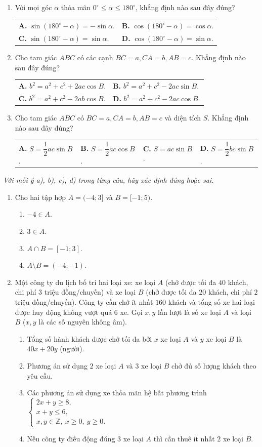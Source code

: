 \documentclass[12pt,a4paper]{article}
\makeatletter
\newcommand{\parttitle}[1]{\par\vspace{3pt}{\large\bfseries\color{ink}#1}\par\vspace{2pt}}
\newcommand{\four}[4]{\par\noindent\begin{tabularx}{\linewidth}{@{}*{4}{>{\raggedright\arraybackslash}X}@{}}\textbf{A.} #1&\textbf{B.} #2&\textbf{C.} #3&\textbf{D.} #4\end{tabularx}}
\newcommand{\two}[4]{\par\noindent\begin{tabularx}{\linewidth}{@{}*{2}{>{\raggedright\arraybackslash}X}@{}}\textbf{A.} #1&\textbf{B.} #2\\[3pt]\textbf{C.} #3&\textbf{D.} #4\end{tabularx}}
\makeatother
\begin{document}
\begin{enumerate}
\four{$\sin\alpha < 0$.}{$\cos\alpha < 0$.}{$\tan\alpha > 0$.}{$\cot\alpha > 0$.}
\item Với mọi góc $\alpha$ thỏa mãn $0^\circ \leq \alpha \leq 180^\circ$, khẳng định nào sau đây đúng?
\two{$\sin(180^\circ - \alpha) = -\sin\alpha$.}{$\cos(180^\circ - \alpha) = \cos\alpha$.}{$\sin(180^\circ - \alpha) = \sin\alpha$.}{$\cos(180^\circ - \alpha) = \sin\alpha$.}
\item Cho tam giác $ABC$ có các cạnh $BC = a, CA = b, AB = c$. Khẳng định nào sau đây đúng?
\two{$b^2 = a^2 + c^2 + 2ac\cos B$.}{$b^2 = a^2 + c^2 - 2ac\sin B$.}{$b^2 = a^2 + c^2 - 2ab\cos B$.}{$b^2 = a^2 + c^2 - 2ac\cos B$.}
\item Cho tam giác $ABC$ có $BC = a, CA = b, AB = c$ và diện tích $S$. Khẳng định nào sau đây đúng?
\four{$S = \dfrac{1}{2}ac\sin B$.}{$S = \dfrac{1}{2}ac\cos B$.}{$S = ac\sin B$.}{$S = \dfrac{1}{2}bc\sin B$.}
\end{enumerate}

\par\vspace{8pt}
\parttitle{PHẦN II. Trắc nghiệm đúng/sai}
\textit{Với mỗi ý a), b), c), d) trong từng câu, hãy xác định đúng hoặc sai.}
\begin{enumerate}
\item Cho hai tập hợp $A = (-4; 3]$ và $B = [-1; 5)$.
\begin{enumerate}
\item $-4 \in A$.
\item $3 \in A$.
\item $A \cap B = [-1; 3]$.
\item $A \setminus B = (-4; -1)$.
\end{enumerate}
\item Một công ty du lịch bố trí hai loại xe: xe loại $A$ (chở được tối đa $40$ khách, chi phí $3$ triệu đồng/chuyến) và xe loại $B$ (chở được tối đa $20$ khách, chi phí $2$ triệu đồng/chuyến). Công ty cần chở ít nhất $160$ khách và tổng số xe hai loại được huy động không vượt quá $6$ xe. Gọi $x, y$ lần lượt là số xe loại $A$ và loại $B$ ($x, y$ là các số nguyên không âm).
\begin{enumerate}
\item Tổng số hành khách được chở tối đa bởi $x$ xe loại $A$ và $y$ xe loại $B$ là $40x + 20y$ (người).
\item Phương án sử dụng $2$ xe loại $A$ và $3$ xe loại $B$ chở đủ số lượng khách theo yêu cầu.
\item Các phương án sử dụng xe thỏa mãn hệ bất phương trình
$\begin{cases} 2x + y \geq 8, \\ x + y \leq 6, \\ x, y \in \mathbb{Z},\ x \geq 0,\ y \geq 0. \end{cases}$
\item Nếu công ty điều động đúng $3$ xe loại $A$ thì cần thuê ít nhất $2$ xe loại $B$.
\end{enumerate}
\end{enumerate}
\end{document}
